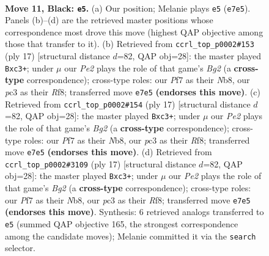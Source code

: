 \documentclass[11pt]{article}
\begin{document}
\clearpage

\begin{figure}[p]\centering
\begin{subfigure}{0.46\textwidth}\centering
\resizebox{\linewidth}{!}{%
\newchessgame
\chessboard[
  setfen={rnb1r1k1/pp2ppbp/3q2p1/2pP2B1/2B1P3/2P5/P2K1PPP/R1Q3NR b - - 4 11},
  showmover=false,
  pgfstyle=straightmove, color=movearrow, markmove={e7-e5}
]}
\caption{}
\end{subfigure}\hfill
\begin{subfigure}{0.46\textwidth}\centering
\resizebox{\linewidth}{!}{%
\newchessgame
\chessboard[
  setfen={rnbq1rk1/pp2ppbp/6p1/2pP4/2B1P3/2B5/PP3PPP/R2QK1NR b KQ - 0 9},
  showmover=false,
  pgfstyle=straightmove, color=movearrow, markmove={g7-c3}
]}
\caption{}
\end{subfigure}
\\[4pt]
\begin{subfigure}{0.46\textwidth}\centering
\resizebox{\linewidth}{!}{%
\newchessgame
\chessboard[
  setfen={rnbq1rk1/pp2ppbp/6p1/2pP4/2B1P3/2B5/PP3PPP/R2QK1NR b KQ - 0 9},
  showmover=false,
  pgfstyle=straightmove, color=movearrow, markmove={g7-c3}
]}
\caption{}
\end{subfigure}\hfill
\begin{subfigure}{0.46\textwidth}\centering
\resizebox{\linewidth}{!}{%
\newchessgame
\chessboard[
  setfen={rnbq1rk1/pp2ppbp/6p1/2pP4/2B1P3/2B5/PP3PPP/R2QK1NR b KQ - 0 9},
  showmover=false,
  pgfstyle=straightmove, color=movearrow, markmove={g7-c3}
]}
\caption{}
\end{subfigure}
\caption{\textbf{Move 11, Black: \texttt{e5}.} (a) Our position; Melanie plays \texttt{e5} (\texttt{e7e5}). Panels (b)--(d) are the retrieved master positions whose correspondence most drove this move (highest QAP objective among those that transfer to it). (b) Retrieved from \texttt{ccrl\_top\_p0002\#153} (ply 17) [structural distance $d$=82, QAP obj=28]: the master played \texttt{Bxc3+}; under $\mu$ our \emph{Pe2} plays the role of that game's \emph{Bg2} (a \textbf{cross-type} correspondence); cross-type roles: our \emph{P}f7 as their \emph{N}b8, our \emph{p}c3 as their \emph{R}f8; transferred move \texttt{e7e5} \textbf{(endorses this move)}. (c) Retrieved from \texttt{ccrl\_top\_p0002\#154} (ply 17) [structural distance $d$=82, QAP obj=28]: the master played \texttt{Bxc3+}; under $\mu$ our \emph{Pe2} plays the role of that game's \emph{Bg2} (a \textbf{cross-type} correspondence); cross-type roles: our \emph{P}f7 as their \emph{N}b8, our \emph{p}c3 as their \emph{R}f8; transferred move \texttt{e7e5} \textbf{(endorses this move)}. (d) Retrieved from \texttt{ccrl\_top\_p0002\#3109} (ply 17) [structural distance $d$=82, QAP obj=28]: the master played \texttt{Bxc3+}; under $\mu$ our \emph{Pe2} plays the role of that game's \emph{Bg2} (a \textbf{cross-type} correspondence); cross-type roles: our \emph{P}f7 as their \emph{N}b8, our \emph{p}c3 as their \emph{R}f8; transferred move \texttt{e7e5} \textbf{(endorses this move)}. Synthesis: 6 retrieved analogs transferred to \texttt{e5} (summed QAP objective 165, the strongest correspondence among the candidate moves); Melanie committed it via the \texttt{search} selector.}
\label{fig:thought-m21}
\end{figure}
\end{document}
